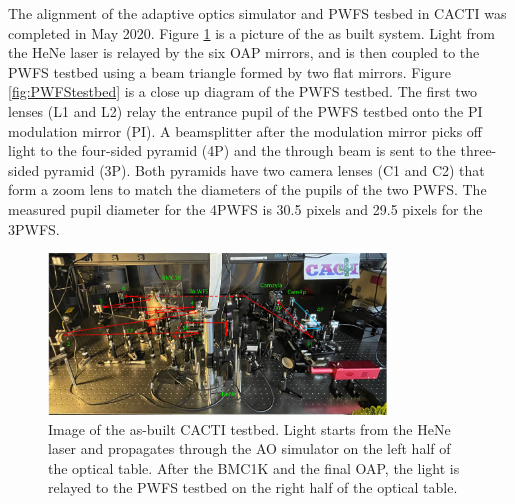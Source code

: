 The alignment of the adaptive optics simulator and PWFS tesbed in CACTI was completed in May 2020. Figure \ref{fig:cactiTestbed} is a picture of the as built system. Light from the HeNe laser is relayed by the six OAP mirrors, and is then coupled to the PWFS testbed using a beam triangle formed by two flat mirrors. Figure \ref{fig:PWFStestbed} is a close up diagram of the PWFS testbed. The first two lenses (L1 and L2) relay the entrance pupil of the PWFS testbed onto the PI modulation mirror (PI). A beamsplitter after the modulation mirror picks off light to the four-sided pyramid (4P) and the through beam is sent to the three-sided pyramid (3P). Both pyramids have two camera lenses (C1 and C2) that form a zoom lens to match the diameters of the pupils of the two PWFS. The measured pupil diameter for the 4PWFS is 30.5 pixels and 29.5 pixels for the 3PWFS. 

\begin{figure}
    \centering
    \includegraphics[width=0.8\textwidth]{Chapter Materials/Chapter Five Materials/cactiTestbed.png}
    \caption{Image of the as-built CACTI testbed. Light starts from the HeNe laser and propagates through the AO simulator on the left half of the optical table. After the BMC1K and the final OAP, the light is relayed to the PWFS testbed on the right half of the optical table.}
    \label{fig:cactiTestbed}
\end{figure}

